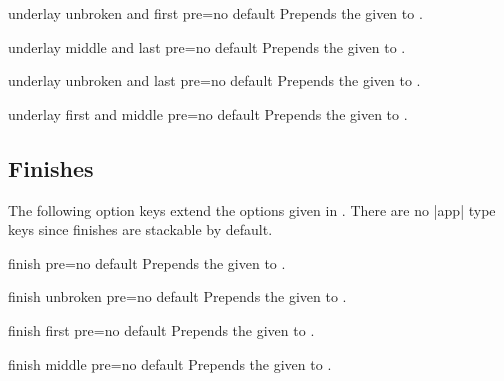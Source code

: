 \begin{docTcbKey}{underlay unbroken and first pre}{=}{no default}
  Prepends the given  to .
\end{docTcbKey}

\begin{docTcbKey}{underlay middle and last pre}{=}{no default}
  Prepends the given  to .
\end{docTcbKey}

\begin{docTcbKey}{underlay unbroken and last pre}{=}{no default}
  Prepends the given  to .
\end{docTcbKey}

\begin{docTcbKey}[][doc new=2014-09-19]{underlay first and middle pre}{=}{no default}
  Prepends the given  to .
\end{docTcbKey}


\clearpage
\subsection{Finishes}
The following option keys extend the options given in .
There are no |app| type keys since finishes are stackable by default.

\begin{docTcbKey}{finish pre}{=}{no default}
  Prepends the given  to .
\end{docTcbKey}

\begin{docTcbKey}{finish unbroken pre}{=}{no default}
  Prepends the given  to .
\end{docTcbKey}

\begin{docTcbKey}{finish first pre}{=}{no default}
  Prepends the given  to .
\end{docTcbKey}

\begin{docTcbKey}{finish middle pre}{=}{no default}
  Prepends the given  to .
\end{docTcbKey}

